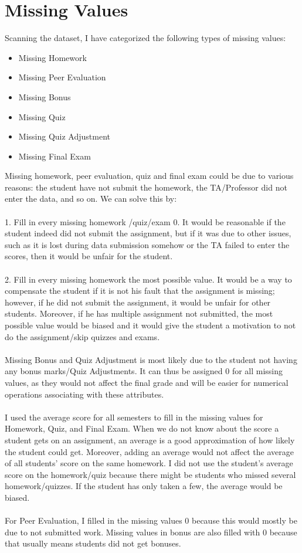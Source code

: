 \documentclass{article}
\begin{document}
\section{Missing Values}
Scanning the dataset, I have categorized the following types of missing values:
\begin{itemize}
    \item Missing Homework
    \item Missing Peer Evaluation
    \item Missing Bonus
    \item Missing Quiz
    \item Missing Quiz Adjustment
    \item Missing Final Exam
\end{itemize}
\justifying
Missing homework, peer evaluation, quiz and final exam could be due to various reasons: the student have not submit the homework, the TA/Professor did not enter the data, and so on. We can solve this by: \\\\
1.	Fill in every missing homework /quiz/exam 0. It would be reasonable if the student indeed did not submit the assignment, but if it was due to other issues, such as it is lost during data submission somehow or the TA failed to enter the scores, then it would be unfair for the student.\\\\
2.	Fill in every missing homework the most possible value. It would be a way to compensate the student if it is not his fault that the assignment is missing; however, if he did not submit the assignment, it would be unfair for other students. Moreover, if he has multiple assignment not submitted, the most possible value would be biased and it would give the student a motivation to not do the assignment/skip quizzes and exams. \\\\
Missing Bonus and Quiz Adjustment is most likely due to the student not having any bonus marks/Quiz Adjustments. It can thus be assigned 0 for all missing values, as they would not affect the final grade and will be easier for numerical operations associating with these attributes. \\\\
I used the average score for all semesters to fill in the missing values for Homework, Quiz, and Final Exam. When we do not know about the score a student gets on an assignment, an average is a good approximation of how likely the student could get. Moreover, adding an average would not affect the average of all students' score on the same homework. I did not use the student's average score on the homework/quiz because there might be students who missed several homework/quizzes. If the student has only taken a few, the average would be biased. \\\\
For Peer Evaluation, I filled in the missing values 0 because this would mostly be due to not submitted work. Missing values in bonus are also filled with 0 because that usually means students did not get bonuses.
\end{document}
